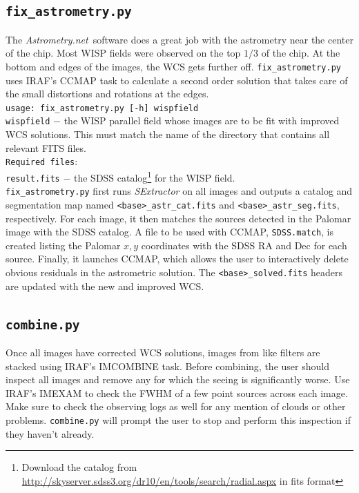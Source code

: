\documentclass{article}
\newcommand{\An}{\textit{Astrometry.net}}
\begin{document}
\subsection{\texttt{fix\_astrometry.py}}
The \An~software does a great job with the astrometry near the 
center of the chip. Most WISP fields
were observed on the top $1/3$ of the chip. At the bottom and edges of 
the images, the WCS gets further off. 
\texttt{fix\_astrometry.py} uses IRAF's CCMAP task to calculate
a second order solution that takes care of the small 
distortions and rotations at the
edges. \\

\texttt{usage: fix\_astrometry.py [-h] wispfield} \\

\texttt{wispfield} $-$ \hangindent=2.7cm the WISP parallel field whose images
are to be fit with improved WCS solutions. This must match the name of 
the directory that contains all relevant FITS files.\\

\texttt{Required files}: \\
\indent \indent \texttt{result.fits} $-$ the SDSS
catalog\footnote{Download the catalog from 
\url{http://skyserver.sdss3.org/dr10/en/tools/search/radial.aspx} in fits
format} for the WISP field. \\

\noindent \texttt{fix\_astrometry.py} first runs \textit{SExtractor}
on all images and outputs a catalog and segmentation map named
\texttt{<base>\_astr\_cat.fits} and \texttt{<base>\_astr\_seg.fits},
respectively. For each image, it then matches the sources detected in the
Palomar image with the SDSS catalog. A file to be used with CCMAP, 
\texttt{SDSS.match}, is created
listing the Palomar $x,y$ coordinates with the SDSS RA and Dec for each 
source. Finally, it launches CCMAP, which allows the user to interactively
delete obvious residuals in the astrometric solution. The 
\texttt{<base>\_solved.fits} headers are updated with the new and 
improved WCS. 

\subsection{\texttt{combine.py}}
Once all images have corrected WCS solutions, images from like filters
are stacked using IRAF's IMCOMBINE task. Before combining, the user should
inspect all images and remove any for which the seeing is significantly worse.
Use IRAF's IMEXAM to check the FWHM of a few point sources across each image.
Make sure to check the observing logs as well for any mention of clouds or 
other problems. \texttt{combine.py} will prompt the user to stop and 
perform this inspection if they haven't already. \\
\end{document}
